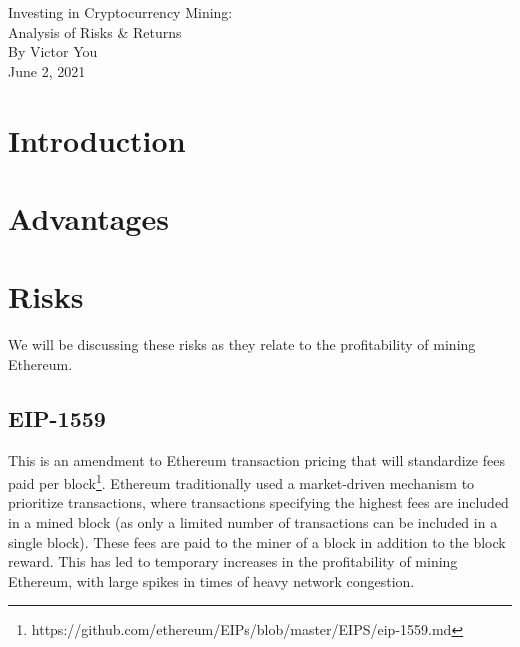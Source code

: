 \documentclass[a4paper,11pt]{article}
\begin{document}
\begin{titlepage}

\begin{center}
\vspace*{6cm}
\Huge Investing in Cryptocurrency Mining:\\
\huge Analysis of Risks \& Returns\\
\vspace*{1cm}
\large By Victor You\\
\vspace*{0.5cm}
\large June 2, 2021
\end{center}
\end{titlepage}

\tableofcontents
{}
\clearpage
{}
\setcounter{page}{1}

\section{Introduction}
\vspace{-10pt}

\vspace{-10pt}

\section{Advantages}
\vspace{-10pt}

\vspace{-10pt}

\section{Risks}
\vspace{-10pt}
We will be discussing these risks as they relate to the profitability of mining Ethereum.
\vspace{-10pt}

\subsection{EIP-1559}
\vspace{-10pt}
This is an amendment to Ethereum transaction pricing that will standardize fees paid per block\footnote{https://github.com/ethereum/EIPs/blob/master/EIPS/eip-1559.md}. Ethereum traditionally used a market-driven mechanism to prioritize transactions, where transactions specifying the highest fees are included in a mined block (as only a limited number of transactions can be included in a single block). These fees are paid to the miner of a block in addition to the block reward. This has led to temporary increases in the profitability of mining Ethereum, with large spikes in times of heavy network congestion. 
\end{document}

